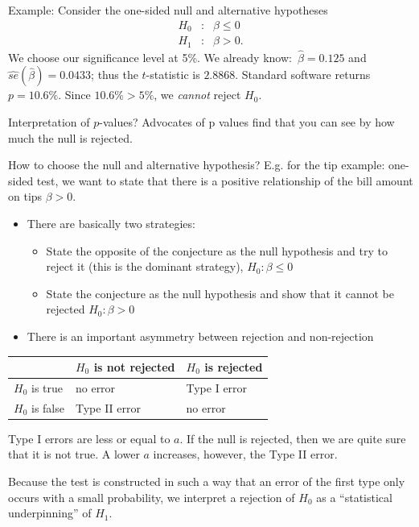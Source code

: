 \documentclass{article}
\begin{document}
Example:
Consider the one-sided null and alternative hypotheses%
\begin{eqnarray*}
	H_{0} &:&\beta \leq 0 \\
	H_{1} &:&\beta >0.
\end{eqnarray*}%
We choose our significance level at 5\%. We already know:\ $\hat{\beta}%
=0.125 $ and $\widehat{se}(\hat{\beta})=0.0433$; thus the $t$-statistic is $%
2.8868$. Standard software returns $p=10.6\%$. Since $10.6\%>5\%$, we \emph{%
	cannot} reject $H_{0}$.

Interpretation of $p$-values? Advocates of p values find that you can see by how much the null is rejected.

How to choose the null and alternative hypothesis? E.g. for the tip example: one-sided test, we want to state that there is a positive relationship of the bill amount on tips $\beta >0$.
\begin{itemize}
	\item There are basically two strategies:
	
	\begin{itemize}
		\item State the opposite of the conjecture as the null hypothesis
		and try to reject it (this is the dominant strategy), $H_0:\beta \leq0$
		
		\item State the conjecture as the null hypothesis 
		and show that it cannot be rejected $H_0:\beta >0$
	\end{itemize}
	
	\item There is an important asymmetry between rejection and
	non-rejection
\end{itemize}
\begin{center}
\begin{tabular}{l|ll}
& $H_0$ is not rejected & $H_0$ is rejected \\\hline
$H_0$ is true & no error & Type I error\\
$H_0$ is false& Type II error& no error
\end{tabular}
\end{center}
Type I errors are less or equal to $a$. If the null is rejected, then we are quite sure that it is not true. A lower $a$ increases, however, the Type II error.

\begin{center}
	
\end{center}
\begin{center}
	
\end{center}
Because the test is constructed in such a way that an error of the first type only occurs with a small probability, we interpret a rejection of $H_0$ as a ``statistical underpinning'' of $H_1$.
\end{document}
